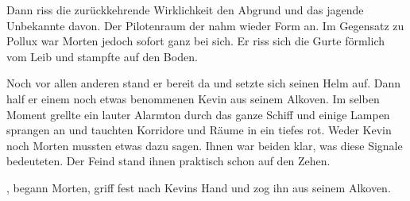 \par

Dann riss die zurückkehrende Wirklichkeit den Abgrund und das jagende Unbekannte davon. Der Pilotenraum der  nahm wieder Form an. Im Gegensatz zu Pollux war Morten jedoch sofort ganz bei sich. Er riss sich die Gurte förmlich vom Leib und stampfte auf den Boden.

\par

Noch vor allen anderen stand er bereit da und setzte sich seinen Helm auf. Dann half er einem noch etwas benommenen Kevin aus seinem Alkoven. Im selben Moment grellte ein lauter Alarmton durch das ganze Schiff und einige Lampen sprangen an und tauchten Korridore und Räume in ein tiefes rot. Weder Kevin noch Morten mussten etwas dazu sagen. Ihnen war beiden klar, was diese Signale bedeuteten. Der Feind stand ihnen praktisch schon auf den Zehen.

\par

, begann Morten, griff fest nach Kevins Hand und zog ihn aus seinem Alkoven. 

